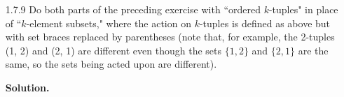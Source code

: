 \begin{enumerate}
   \item[1.7.9]   Do both parts of the preceding exercise with ``ordered
                  $k$-tuples" in place of ``$k$-element subsets," where the
                  action on $k$-tuples is defined as above but with set braces
                  replaced by parentheses (note that, for example, the 2-tuples
                  (1, 2) and (2, 1) are different even though the sets
                  $\{1, 2\}$ and $\{2, 1\}$ are the same, so the sets being
                  acted upon are different).

      \textbf{Solution.}
   

\end{enumerate}
